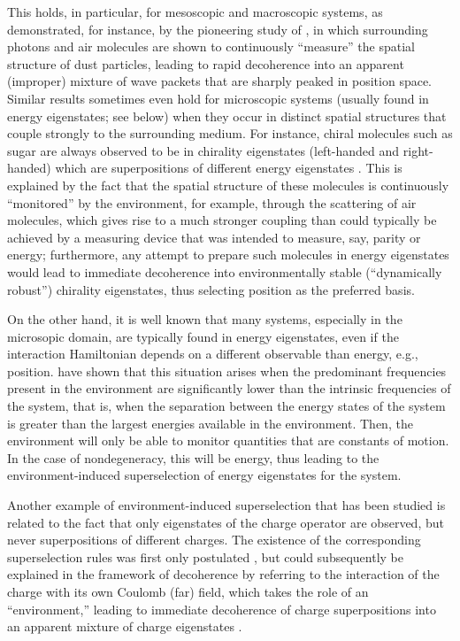 \documentclass[rmp,aps,amsmath,amsfonts,noshowkeys,noshowpacs,12pt]{revtex4}
\begin{document}
This holds, in particular, for mesoscopic and macroscopic systems, as
demonstrated, for instance, by the pioneering study of
\citet{Joos:1985:iu}, in which surrounding photons and air molecules
are shown to continuously ``measure'' the spatial structure of dust
particles, leading to rapid decoherence into an apparent (improper)
mixture of wave packets that are sharply peaked in position space.
Similar results sometimes even hold for microscopic systems (usually
found in energy eigenstates; see below) when they occur in distinct
spatial structures that couple strongly to the surrounding medium. For
instance, chiral molecules such as sugar are always observed to be in
chirality eigenstates (left-handed and right-handed) which are
superpositions of different energy eigenstates
\citep{Harris:1981:rc,Zeh:1999:qr}.  This is explained by the fact
that the spatial structure of these molecules is continuously
``monitored'' by the environment, for example, through the scattering
of air molecules, which gives rise to a much stronger coupling than
could typically be achieved by a measuring device that was intended to
measure, say, parity or energy; furthermore, any attempt to prepare
such molecules in energy eigenstates would lead to immediate
decoherence into environmentally stable (``dynamically robust'')
chirality eigenstates, thus selecting position as the preferred basis.

On the other hand, it is well known that many systems, especially in the
microsopic domain, are typically found in energy eigenstates, even if
the interaction Hamiltonian depends on a different observable than
energy, e.g., position. \citet{Paz:1999:vv} have shown that this
situation arises when the predominant frequencies  present in the
environment are significantly lower than the intrinsic frequencies of
the system, that is, when the separation between the energy states of
the system is greater than the largest energies available in the
environment. Then, the environment will only be able to monitor
quantities that are constants of motion. In the case of
nondegeneracy, this will be energy, thus leading to the
environment-induced superselection of energy eigenstates for the
system.

Another example of environment-induced superselection that has been
studied is related to the fact that only eigenstates of the charge
operator are observed, but never superpositions of different charges.
The existence of the corresponding superselection rules was first only
postulated \citep{Wick:1952:pp,Wick:1970:iz}, but could subsequently be
explained in the framework of decoherence by referring to the
interaction of the charge with its own Coulomb (far) field, which takes
the role of an ``environment,'' leading to immediate decoherence of
charge superpositions into an apparent mixture of charge eigenstates
\citep{Giulini:1995:zh,Giulini:2000:ry}.
\end{document}
